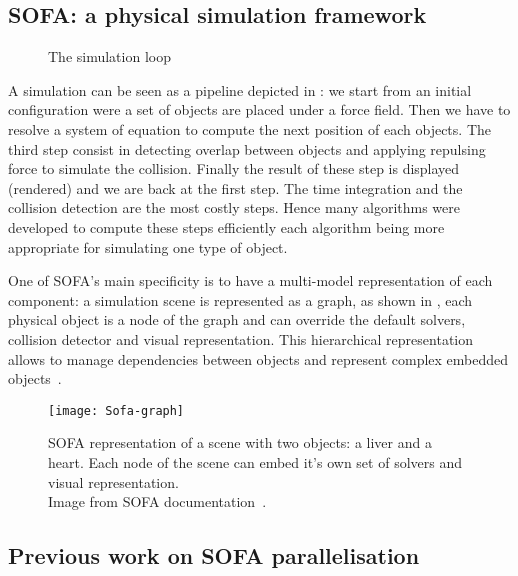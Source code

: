 \subsection{SOFA: a physical simulation framework}

\begin{figure}[htb]
    \centering
    
    \caption[The simulation loop]{The simulation loop}
    \label{fig:simu-pipeline}
\end{figure}


A simulation can be seen as a pipeline depicted in : we start from an initial configuration were a set of objects are placed under a force field.
Then we have to resolve a system of equation to compute the next position of each objects.
The third step consist in detecting overlap between objects and applying repulsing force to simulate the collision.
 Finally the result of these step is displayed (rendered) and we are back at the first step.
The time integration and the collision detection are the most costly steps.
Hence many algorithms  were developed to compute these steps efficiently each algorithm being more appropriate for simulating one type of object.

One of \gls{SOFA}'s main specificity is to have a multi-model representation of each component: a simulation scene is represented as a graph, as shown in , each physical object is a node of the graph and can override the default solvers, collision detector and visual representation.
This hierarchical representation allows to manage dependencies between objects and represent complex embedded objects~\cite{Nesme09Preserving,Faure11Sparse}.

\begin{figure}[htb]
    \centering
    \texttt{[image: Sofa-graph]}
    \caption[Example of SOFA scene graph]{SOFA representation of a scene with two objects: a liver and a
        heart. Each node of the scene can embed it's own set of solvers and
        visual representation.\\
        Image from SOFA documentation~\cite{SOFA16Sofa}.}
    \label{fig:sofa-tree}
\end{figure}

\subsection{Previous work on SOFA parallelisation}


